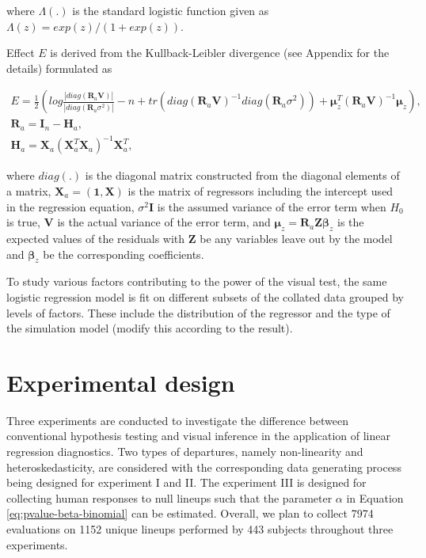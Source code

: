 \documentclass[]{interact}
\theoremstyle{plain}%
\theoremstyle{definition}
\theoremstyle{remark}
\begin{document}
\noindent where \(\Lambda(.)\) is the standard logistic function given
as \(\Lambda(z) = exp(z)/(1+exp(z))\).

Effect \(E\) is derived from the Kullback-Leibler divergence (see
Appendix for the details) formulated as

\small

\begin{gather}  \label{eq:effect-size}
E = \frac{1}{2}\left(log\frac{|diag(\boldsymbol{R}_a\boldsymbol{V})|}{|diag(\boldsymbol{R}_a\sigma^2)|} - n + tr(diag(\boldsymbol{R}_a\boldsymbol{V})^{-1}diag(\boldsymbol{R}_a\sigma^2)) + \boldsymbol{\mu}_z^{T}(\boldsymbol{R}_a\boldsymbol{V})^{-1}\boldsymbol{\mu}_z\right),\\
\boldsymbol{R}_a = \boldsymbol{I}_n - \boldsymbol{H}_a,\\
\boldsymbol{H}_a = \boldsymbol{X}_a(\boldsymbol{X}_a^T\boldsymbol{X}_a)^{-1}\boldsymbol{X}_a^T,
\end{gather}

\normalsize

\noindent where \(diag(.)\) is the diagonal matrix constructed from the
diagonal elements of a matrix,
\(\boldsymbol{X}_a = (\boldsymbol{1}, \boldsymbol{X})\) is the matrix of
regressors including the intercept used in the regression equation,
\(\sigma^2\boldsymbol{I}\) is the assumed variance of the error term
when \(H_0\) is true, \(\boldsymbol{V}\) is the actual variance of the
error term, and
\(\boldsymbol{\mu}_z = \boldsymbol{R}_a\boldsymbol{Z}\boldsymbol{\beta}_z\)
is the expected values of the residuals with \(\boldsymbol{Z}\) be any
variables leave out by the model and \(\boldsymbol{\beta}_z\) be the
corresponding coefficients.

To study various factors contributing to the power of the visual test,
the same logistic regression model is fit on different subsets of the
collated data grouped by levels of factors. These include the
distribution of the regressor and the type of the simulation model
(modify this according to the result).

\hypertarget{experimental-design}{%
\section{Experimental design}\label{experimental-design}}

Three experiments are conducted to investigate the difference between
conventional hypothesis testing and visual inference in the application
of linear regression diagnostics. Two types of departures, namely
non-linearity and heteroskedasticity, are considered with the
corresponding data generating process being designed for experiment I
and II. The experiment III is designed for collecting human responses to
null lineups such that the parameter \(\alpha\) in Equation
\ref{eq:pvalue-beta-binomial} can be estimated. Overall, we plan to
collect 7974 evaluations on 1152 unique lineups performed by 443
subjects throughout three experiments.
\end{document}
